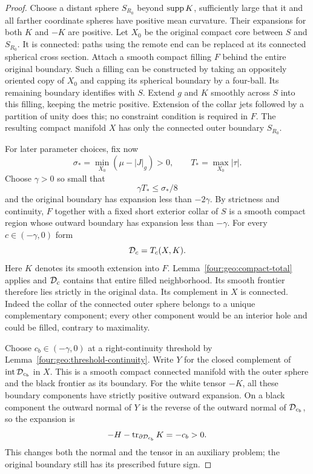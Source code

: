 \begin{proof}
Choose a distant sphere $S_{R_0}$ beyond $\operatorname{supp} K$, sufficiently large that
it and all farther coordinate spheres have positive mean curvature.
Their expansions for both $K$ and $-K$ are positive.  Let $X_0$ be the
original compact core between $S$ and $S_{R_0}$.  It is connected: paths
using the remote end can be replaced at its connected spherical cross
section.  Attach a smooth compact filling $F$ behind the entire original
boundary.  Such a filling can be constructed by taking an oppositely
oriented copy of $X_0$ and capping its spherical boundary by a four-ball.
Its remaining boundary identifies with $S$.  Extend $g$ and $K$ smoothly
across $S$ into this filling, keeping the metric positive.  Extension of
the collar jets followed by a partition of unity does this; no constraint
condition is required in $F$.  The resulting compact manifold $X$ has
only the connected outer boundary $S_{R_0}$.

For later parameter choices, fix now
\[
 \sigma_* =\min_{X_0}(\mu-|J|_g)>0,
 \qquad T_* =\max_{X_0}|\tau|.
\]
Choose $\gamma>0$ so small that
\begin{equation}\label{four:geo:threshold-budget}
 \gamma T_*\le\sigma_*/8
\end{equation}
and the original boundary has expansion less than $-2\gamma$.
By strictness and continuity, $F$ together with a fixed short exterior
collar of $S$ is a smooth compact region whose outward boundary has
expansion less than $-\gamma$.  For every $c\in(-\gamma,0)$ form
\[
 \mathcal D_c=T_c(X,K).
\]
Here $K$ denotes its smooth extension into $F$.  Lemma~\ref{four:geo:compact-total}
applies and $\mathcal D_c$ contains that entire filled neighborhood.  Its smooth
frontier therefore lies strictly in the original data.  Its complement
in $X$ is connected.  Indeed the collar of the connected outer sphere
belongs to a unique complementary component; every other component would
be an interior hole and could be filled, contrary to maximality.

Choose $c_b\in(-\gamma,0)$ at a right-continuity threshold by
Lemma~\ref{four:geo:threshold-continuity}.  Write $Y$ for the closed complement
of $\operatorname{int}\mathcal D_{c_b}$ in $X$.  This is a smooth compact connected
manifold with the outer sphere and the black frontier as its boundary.
For the white tensor $-K$, all these boundary components have strictly
positive outward expansion.  On a black component the outward normal of
$Y$ is the reverse of the outward normal of $\mathcal D_{c_b}$, so the expansion
is
\begin{equation}\label{four:geo:reversed-black-barrier}
 -H-\operatorname{tr}_{\partial\mathcal D_{c_b}}K=-c_b>0.
\end{equation}
This changes both the normal and the tensor in an auxiliary problem;
the original boundary still has its prescribed future sign.


\end{proof}
